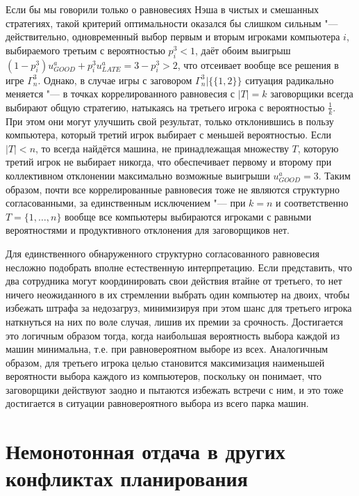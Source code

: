 Если бы мы говорили только о равновесиях Нэша в чистых и смешанных стратегиях, такой критерий оптимальности оказался бы слишком сильным "--- действительно, одновременный выбор первым и вторым игроками компьютера $i$, выбираемого третьим с вероятностью $p_i^3 < 1$, даёт обоим выигрыш $(1 - p_i^3) u^a_{GOOD} + p_i^3 u^a_{LATE} = 3 - p_i^3 > 2$, что отсеивает вообще все решения в игре $\Gamma^3_n$. Однако, в случае игры с заговором $\Gamma^3_n | \{\{1,2\}\}$ ситуация радикально меняется "--- в точках коррелированного равновесия с $\left| T \right| = k$ заговорщики всегда выбирают общую стратегию, натыкаясь на третьего игрока с вероятностью $\frac{1}{k}$. При этом они могут улучшить свой результат, только отклонившись в пользу компьютера, который третий игрок выбирает с меньшей вероятностью. Если $\left| T \right| < n$, то всегда найдётся машина, не принадлежащая множеству $T$, которую третий игрок не выбирает никогда, что обеспечивает первому и второму при коллективном отклонении максимально возможные выигрыши $u^a_{GOOD} = 3$. Таким образом, почти все коррелированные равновесия тоже не являются структурно согласованными, за единственным исключением "--- при $k = n$ и соответственно $T = \{1, \ldots, n\}$ вообще все компьютеры выбираются игроками с равными вероятностями и продуктивного отклонения для заговорщиков нет.

Для единственного обнаруженного структурно согласованного равновесия несложно подобрать вполне естественную интерпретацию. Если представить, что два сотрудника могут координировать свои действия втайне от третьего, то нет ничего неожиданного в их стремлении выбрать один компьютер на двоих, чтобы избежать штрафа за недозагруз, минимизируя при этом шанс для третьего игрока наткнуться на них по воле случая, лишив их премии за срочность. Достигается это логичным образом тогда, когда наибольшая вероятность выбора каждой из машин минимальна, т.е. при равновероятном выборе из всех. Аналогичным образом, для третьего игрока целью становится максимизация наименьшей вероятности выбора каждого из компьютеров, поскольку он понимает, что заговорщики действуют заодно и пытаются избежать встречи с ним, и это тоже достигается в ситуации равновероятного выбора из всего парка машин.

\section{Немонотонная отдача в других конфликтах планирования}\label{sec:ch2/sec6}


